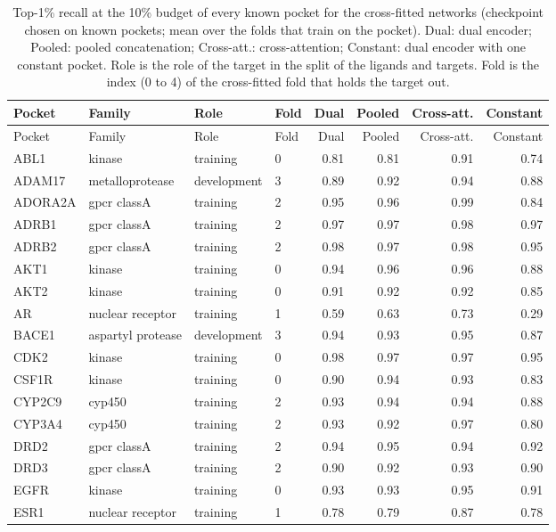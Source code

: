 \begin{longtable}{llllrrrr}
\caption{Top-1\% recall at the 10\% budget of every known pocket for the cross-fitted networks (checkpoint chosen on known pockets; mean over the folds that train on the pocket). Dual: dual encoder; Pooled: pooled concatenation; Cross-att.: cross-attention; Constant: dual encoder with one constant pocket. Role is the role of the target in the split of the ligands and targets. Fold is the index (0 to 4) of the cross-fitted fold that holds the target out.}\label{tab:si_known_cv_targets}\\
\toprule
Pocket & Family & Role & Fold & Dual & Pooled & Cross-att. & Constant \\
\midrule
\endfirsthead
\toprule
Pocket & Family & Role & Fold & Dual & Pooled & Cross-att. & Constant \\
\midrule
\endhead
ABL1 & kinase & training & 0 & 0.81 & 0.81 & 0.91 & 0.74 \\
ADAM17 & metalloprotease & development & 3 & 0.89 & 0.92 & 0.94 & 0.88 \\
ADORA2A & gpcr classA & training & 2 & 0.95 & 0.96 & 0.99 & 0.84 \\
ADRB1 & gpcr classA & training & 2 & 0.97 & 0.97 & 0.98 & 0.97 \\
ADRB2 & gpcr classA & training & 2 & 0.98 & 0.97 & 0.98 & 0.95 \\
AKT1 & kinase & training & 0 & 0.94 & 0.96 & 0.96 & 0.88 \\
AKT2 & kinase & training & 0 & 0.91 & 0.92 & 0.92 & 0.85 \\
AR & nuclear receptor & training & 1 & 0.59 & 0.63 & 0.73 & 0.29 \\
BACE1 & aspartyl protease & development & 3 & 0.94 & 0.93 & 0.95 & 0.87 \\
CDK2 & kinase & training & 0 & 0.98 & 0.97 & 0.97 & 0.95 \\
CSF1R & kinase & training & 0 & 0.90 & 0.94 & 0.93 & 0.83 \\
CYP2C9 & cyp450 & training & 2 & 0.93 & 0.94 & 0.94 & 0.88 \\
CYP3A4 & cyp450 & training & 2 & 0.93 & 0.92 & 0.97 & 0.80 \\
DRD2 & gpcr classA & training & 2 & 0.94 & 0.95 & 0.94 & 0.92 \\
DRD3 & gpcr classA & training & 2 & 0.90 & 0.92 & 0.93 & 0.90 \\
EGFR & kinase & training & 0 & 0.93 & 0.93 & 0.95 & 0.91 \\
ESR1 & nuclear receptor & training & 1 & 0.78 & 0.79 & 0.87 & 0.78 \\

\end{longtable}
